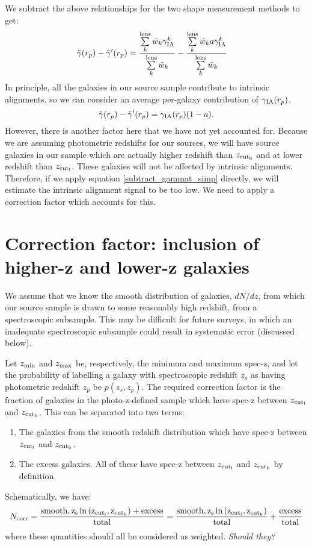 \documentclass[onecolumn,amsmath,aps,fleqn, superscriptaddress]{revtex4}
\begin{document}
We subtract the above relationships for the two shape measurement methods to get:
\begin{align}
\tilde{\gamma}(r_p) - \tilde{\gamma}^\prime(r_p) &= \frac{\sum\limits_{k}^{\rm lens} \tilde{w}_k \gamma_{\rm IA}^k}{\sum\limits_{k}^{\rm lens} \tilde{w}_k} - \frac{\sum\limits_{k}^{\rm lens} \tilde{w}_k a \gamma_{\rm IA}^k}{\sum\limits_{k}^{\rm lens} \tilde{w}_k} 
\label{subtract_gammat}
\end{align}
In principle, all the galaxies in our source sample contribute to intrinsic alignments, so we can consider an average per-galaxy contribution of $\gamma_{\rm IA}(r_p)$.
\begin{equation}
\tilde{\gamma}(r_p) - \tilde{\gamma}^\prime(r_p) = \gamma_{\rm IA}(r_p)(1-a).
\label{subtract_gammat_simp}
\end{equation}
However, there is another factor here that we have not yet accounted for. Because we are assuming photometric redshifts for our sources, we will have source galaxies in our sample which are actually higher redshift than $z_{\rm cut_h}$ and at lower redshift than $z_{\rm cut_l}$. These galaxies will not be affected by intrinsic alignments. Therefore, if we apply equation \ref{subtract_gammat_simp} directly, we will estimate the intrinsic alignment signal to be too low. We need to apply a correction factor which accounts for this. 

\section*{Correction factor: inclusion of higher-z and lower-z galaxies}
We assume that we know the smooth distribution of galaxies, $dN / dz$, from which our source sample is drawn to some reasonably high redshift, from a spectroscopic subsample. This may be difficult for future surveys, in which an inadequate spectroscopic subsample could result in systematic error (discussed below). 

Let $z_{\rm min}$ and $z_{\rm max}$ be, respectively, the minimum and maximum spec-z, and let the probability of labelling a galaxy with spectroscopic redshift $z_s$ as having photometric redshift $z_p$ be $p(z_s, z_p)$. The required correction factor is the fraction of galaxies in the photo-z-defined sample which have spec-z between $z_{\rm cut_l}$ and $z_{\rm cut_h}$. This can be separated into two terms:
\begin{enumerate}
\item{The galaxies from the smooth redshift distribution which have spec-z between $z_{\rm cut_l}$ and $z_{\rm cut_h}$.}
\item{The excess galaxies. All of these have spec-z between $z_{\rm cut_l}$ and $z_{\rm cut_h}$ by definition.}
\end{enumerate}
Schematically, we have:
\begin{equation}
N_{\rm corr} = \frac{{\rm smooth, z_s \, in \, (z_{\rm cut_l}, z_{\rm cut_h})} + {\rm excess}}{{\rm total}} =  \frac{{\rm smooth, z_s \, in \, (z_{\rm cut_l}, z_{\rm cut_h})}}{{\rm total}} + \frac{{\rm excess}}{{\rm total}}
\label{schematic}
\end{equation}
where these quantities should all be considered as weighted. {\it Should they?}
\end{document}
